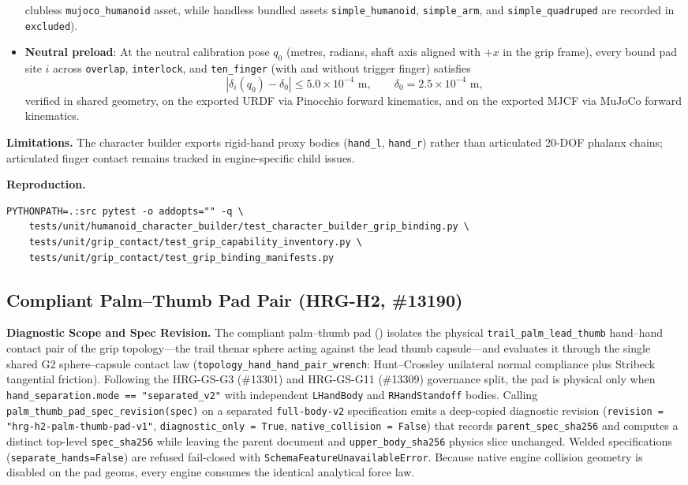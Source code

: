 \documentclass[11pt,a4paper]{article}
\begin{document}
\begin{itemize}
clubless \texttt{mujoco\_humanoid} asset, while handless bundled assets
\texttt{simple\_humanoid}, \texttt{simple\_arm}, and \texttt{simple\_quadruped}
are recorded in \texttt{excluded}).
\item \textbf{Neutral preload}: At the neutral calibration pose $q_0$ (metres,
radians, shaft axis aligned with $+x$ in the grip frame), every bound pad site $i$
 across \texttt{overlap}, \texttt{interlock}, and \texttt{ten\_finger} (with and
without trigger finger) satisfies
\[
  \left|\delta_i(q_0) - \delta_0\right| \le 5.0\times 10^{-4}\text{ m},
  \qquad \delta_0 = 2.5\times 10^{-4}\text{ m},
\]
verified in shared geometry, on the exported URDF via Pinocchio forward
kinematics, and on the exported MJCF via MuJoCo forward kinematics.
\end{itemize}

\textbf{Limitations.} The character builder exports rigid-hand proxy bodies
(\texttt{hand\_l}, \texttt{hand\_r}) rather than articulated 20-DOF phalanx
chains; articulated finger contact remains tracked in engine-specific child
issues.

\textbf{Reproduction.}
\begin{verbatim}
PYTHONPATH=.:src pytest -o addopts="" -q \
    tests/unit/humanoid_character_builder/test_character_builder_grip_binding.py \
    tests/unit/grip_contact/test_grip_capability_inventory.py \
    tests/unit/grip_contact/test_grip_binding_manifests.py
\end{verbatim}

\subsection{Compliant Palm--Thumb Pad Pair (HRG-H2, \#13190)}
\textbf{Diagnostic Scope and Spec Revision.} The compliant palm--thumb pad () isolates the physical \texttt{trail\_palm\_lead\_thumb} hand--hand contact pair of the grip topology---the trail thenar sphere acting against the lead thumb capsule---and evaluates it through the single shared G2 sphere--capsule contact law (\texttt{topology\_hand\_hand\_pair\_wrench}: Hunt--Crossley unilateral normal compliance plus Stribeck tangential friction). Following the HRG-GS-G3 (\#13301) and HRG-GS-G11 (\#13309) governance split, the pad is physical only when \texttt{hand\_separation.mode == "separated\_v2"} with independent \texttt{LHandBody} and \texttt{RHandStandoff} bodies. Calling \texttt{palm\_thumb\_pad\_spec\_revision(spec)} on a separated \texttt{full-body-v2} specification emits a deep-copied diagnostic revision (\texttt{revision = "hrg-h2-palm-thumb-pad-v1"}, \texttt{diagnostic\_only = True}, \texttt{native\_collision = False}) that records \texttt{parent\_spec\_sha256} and computes a distinct top-level \texttt{spec\_sha256} while leaving the parent document and \texttt{upper\_body\_sha256} physics slice unchanged. Welded specifications (\texttt{separate\_hands=False}) are refused fail-closed with \texttt{SchemaFeatureUnavailableError}. Because native engine collision geometry is disabled on the pad geoms, every engine consumes the identical analytical force law.
\end{document}
